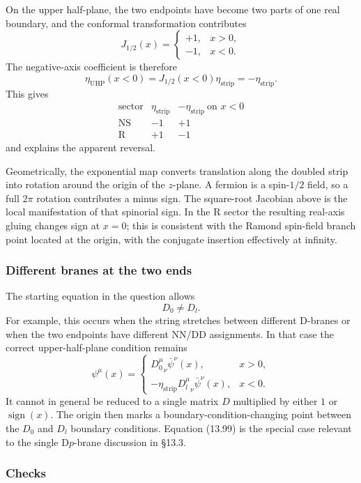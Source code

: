 \documentclass[
  10pt,
  a4paper,
  openany]{book}
\begin{document}
On the upper half-plane, the two endpoints have become two parts of one
real boundary, and the conformal transformation contributes \[
J_{1/2}(x)
=
\begin{cases}
+1,&x>0,\\
-1,&x<0.
\end{cases}
\] The negative-axis coefficient is therefore \[
\eta_{\mathrm{UHP}}(x<0)
=J_{1/2}(x<0)\eta_{\mathrm{strip}}
=-\eta_{\mathrm{strip}}.
\] This gives \[
\begin{array}{c|c|c}
\text{sector}
&\eta_{\mathrm{strip}}
&-\eta_{\mathrm{strip}}\ \text{on }x<0\\
\hline
\mathrm{NS}&-1&+1\\
\mathrm R&+1&-1
\end{array}
\] and explains the apparent reversal.

Geometrically, the exponential map converts translation along the
doubled strip into rotation around the origin of the \(z\)-plane. A
fermion is a spin-\(1/2\) field, so a full \(2\pi\) rotation contributes
a minus sign. The square-root Jacobian above is the local manifestation
of that spinorial sign. In the R sector the resulting real-axis gluing
changes sign at \(x=0\); this is consistent with the Ramond spin-field
branch point located at the origin, with the conjugate insertion
effectively at infinity.

\subsubsection{Different branes at the two
ends}\label{different-branes-at-the-two-ends}

The starting equation in the question allows \[
D_0\neq D_l.
\] For example, this occurs when the string stretches between different
D-branes or when the two endpoints have different NN/DD assignments. In
that case the correct upper-half-plane condition remains \[
\psi^\mu(x)
=
\begin{cases}
{D_0^\mu}_{\nu}\bar\psi^\nu(x),&x>0,\\[2mm]
-\eta_{\mathrm{strip}}{D_l^\mu}_{\nu}\bar\psi^\nu(x),&x<0.
\end{cases}
\] It cannot in general be reduced to a single matrix \(D\) multiplied
by either \(1\) or \(\operatorname{sign}(x)\). The origin then marks a
boundary-condition-changing point between the \(D_0\) and \(D_l\)
boundary conditions. Equation (13.99) is the special case relevant to
the single D\(p\)-brane discussion in §13.3.

\subsubsection{Checks}\label{checks-13}
\end{document}
